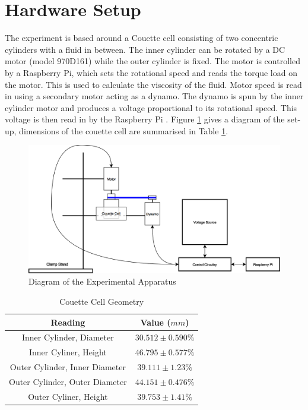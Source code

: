 \documentclass[twoside,a4]{report}
\def\rpi{Raspberry Pi }
\begin{document}
	\section{Hardware Setup} %
	The experiment is based around a Couette cell consisting of two concentric cylinders with a fluid in between. The inner cylinder can be rotated by a DC motor (model 970D161) while the outer cylinder is fixed. The motor is controlled by a Raspberry Pi, which sets the rotational speed and reads the torque load on the motor. This is used to calculate the viscosity of the fluid. Motor speed is read in using a secondary motor acting as a dynamo. The dynamo is spun by the inner cylinder motor and produces a voltage proportional to its rotational speed. This voltage is then read in by the \rpi.
	Figure \ref{expdia} gives a diagram of the set-up, dimensions of the couette cell are summarised in Table \ref{tabcellgeom}.\newline
	\begin{figure}[!htb]
		\centering
		\includegraphics[scale=0.3]{images/exp_set_up.png} %
		\caption{Diagram of the Experimental Apparatus}
		\label{expdia}
	\end{figure} \newline \noindent
	\begin{table}
		\centering
		\begin{tabular}{|c|c|}
			\hline
			Reading 						& Value ($mm$) \\
			\hline
			Inner Cylinder, Diameter 		& $30.512 \pm 0.590 \%$\\
			Inner Cyliner, Height 			& $46.795 \pm 0.577 \%$\\
			Outer Cylinder, Inner Diameter 	& $39.111 \pm 1.23 \%$\\
			Outer Cylinder, Outer Diameter 	& $44.151 \pm 0.476 \%$\\
			Outer Cyliner, Height 			& $39.753 \pm 1.41 \%$\\
			\hline
		\end{tabular}
		\caption{Couette Cell Geometry}
		\label{tabcellgeom}
	\end{table}
\end{document}
